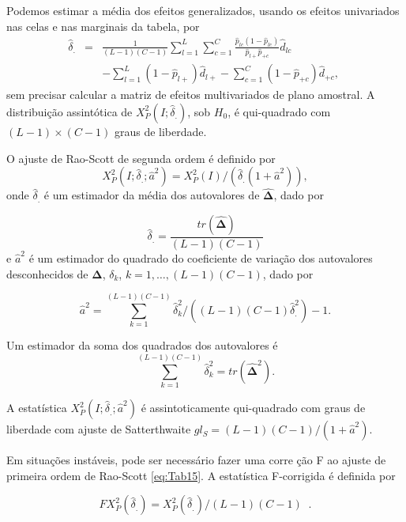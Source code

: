 \documentclass[]{book}
\numberwithin{example}{chapter}
\numberwithin{remark}{chapter}
\numberwithin{definition}{chapter}
\begin{document}
Podemos estimar a média dos efeitos generalizados, usando os efeitos
univariados nas celas e nas marginais da tabela, por \[
\begin{array}{lll}
\hat{\delta}_{.} & = & \frac{1}{\left( L-1\right) \left( C-1\right) }
\sum\limits_{l=1}^{L}\sum\limits_{c=1}^{C}\frac{\hat{p}_{lc}\left( 1-\hat{p}
_{lc}\right) }{\hat{p}_{l+}\hat{p}_{+c}}\hat{d}_{lc} \\ 
&  & -\sum\limits_{l=1}^{L}\left( 1-\hat{p}_{l+}\right) \hat{d}
_{l+}-\sum\limits_{c=1}^{C}\left( 1-\hat{p}_{+c}\right) \hat{d}_{+c},
\end{array}
\;
\] sem precisar calcular a matriz de efeitos multivariados de plano
amostral. A distribuição assintótica de
\(X_{P}^{2}\left( I;\hat{\delta} _{.}\right)\), sob \(H_{0}\), é
qui-quadrado com \(\left( L-1\right) \times \left( C-1\right)\) graus de
liberdade.

O ajuste de Rao-Scott de segunda ordem é definido por \[
X_{P}^{2}\left( I;\hat{\delta}_{.};\hat{a}^{2}\right) =X_{P}^{2}\left(
I\right) /\left( \hat{\delta}_{.}\left( 1+\hat{a}^{2}\right) \right), 
\] onde \(\hat{\delta}_{.}\) é um estimador da média dos autovalores de
\(\mathbf{\hat{\Delta}}\), dado por

\[
\hat{\delta}_{.}=\frac{tr\left( \mathbf{\hat{\Delta}}\right) }{\left(
L-1\right) \left( C-1\right) } 
\] e \(\hat{a}^{2}\) é um estimador do quadrado do coeficiente de
variação dos autovalores desconhecidos de \(\mathbf{\Delta}\),
\(\delta _{k}\), \(k=1,\ldots ,\left( L-1\right) \left( C-1\right)\),
dado por

\[
\hat{a}^{2}=\sum\limits_{k=1}^{\left( L-1\right) \left( C-1\right) }\hat{
\delta}_{k}^{2}/\left( \left( L-1\right) \left( C-1\right) \hat{\delta}
_{.}^{2}\right) -1. 
\]

Um estimador da soma dos quadrados dos autovalores é \[
\sum\limits_{k=1}^{\left( L-1\right) \left( C-1\right) }\hat{\delta}
_{k}^{2}=tr\left( \mathbf{\hat{\Delta}}^{2}\right).
\]

A estatística \(X_{P}^{2}\left( I;\hat{\delta}_{.};\hat{a}^{2}\right)\)
é assintoticamente qui-quadrado com graus de liberdade com ajuste de
Satterthwaite
\(gl_{S}=\left( L-1\right) \left( C-1\right) /\left( 1+\hat{a} ^{2}\right) .\)

Em situações instáveis, pode ser necessário fazer uma corre ção F ao
ajuste de primeira ordem de Rao-Scott \eqref{eq:Tab15}. A estatística
F-corrigida é definida por

\begin{equation}
FX_{P}^{2}\left( \hat{\delta}_{.}\right) =X_{P}^{2}\left( \hat{\delta}
_{.}\right) /\left( L-1\right) \left( C-1\right) \;\;.  \label{eq:Tab16}
\end{equation}
\end{document}
